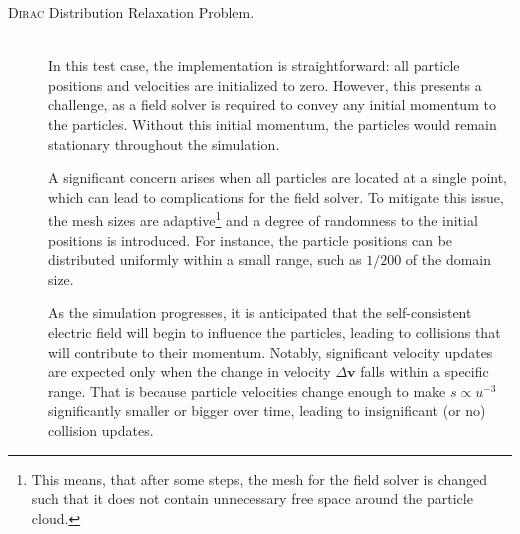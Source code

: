 \begin{description}
    \item[\textsc{Dirac} Distribution Relaxation Problem.] \hfill \\
    In this test case, the implementation is straightforward: all particle positions and velocities are initialized to zero. However, this presents a challenge, as a field solver is required to convey any initial momentum to the particles. Without this initial momentum, the particles would remain stationary throughout the simulation.
    
    A significant concern arises when all particles are located at a single point, which can lead to complications for the field solver. To mitigate this issue, the mesh sizes are adaptive\footnote{This means, that after some steps, the mesh for the field solver is changed such that it does not contain unnecessary free space around the particle cloud.} and a degree of randomness to the initial positions is introduced. For instance, the particle positions can be distributed uniformly within a small range, such as $1/200$ of the domain size. 
    
    As the simulation progresses, it is anticipated that the self-consistent electric field will begin to influence the particles, leading to collisions that will contribute to their momentum. Notably, significant velocity updates are expected only when the change in velocity $\Delta \mathbf{v}$ falls within a specific range. That is because particle velocities change enough to make $s \propto u^{-3}$ significantly smaller or bigger over time, leading to insignificant (or no) collision updates.


\end{description}
